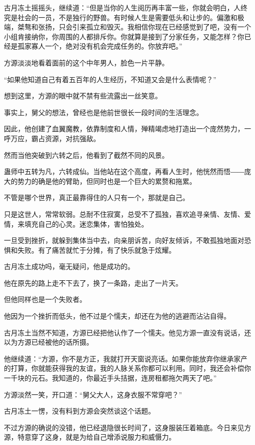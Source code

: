 \begin{this_body}
古月冻土摇摇头，继续道：“但是当你的人生阅历再丰富一些，你就会明白，人终究是社会的一员，不是独行的野兽。有时候人生是需要低头和让步的。偏激和极端，桀骜和张扬，只会引来孤立和毁灭。我相信你现在已经感觉到了吧，没有一个小组肯接纳你，你周围的人都排斥你。你就算是接到了分家任务，又能怎样？你已经是孤家寡人一个，绝对没有机会完成任务的。你放弃吧。”

方源淡淡地看着面前的这个中年男人，脸色一片平静。

“如果他知道自己有着五百年的人生经历，不知道又会是什么表情呢？”

想到这里，方源的眼中就不禁有些流露出一丝笑意。

事实上，舅父的想法，曾经也是他前世很长一段时间的生活理念。

因此，他创建了血翼魔教，依靠制度和人情，殚精竭虑地打造出一个庞然势力，一呼万应，霸占资源，对抗强敌。

然而当他突破到六转之后，他看到了截然不同的风景。

蛊师中五转为凡，六转成仙。当他站在这个高度，再看人生时，他恍然而悟――庞大的势力的确是他的臂助，但同时也是一个巨大的累赘和拖累。

不管是哪个世界，真正最靠得住的人只有一个，那就是自己。

只是这世人，常常软弱。总耐不住寂寞，总受不了孤独，喜欢追寻亲情、友情、爱情，来填充自己的心灵。迷恋集体，害怕独处。

一旦受到挫折，就躲到集体当中去，向亲朋诉苦，向好友倾诉，不敢孤独地面对恐惧和失败。有了痛苦就忙于分摊，有了快乐就急于炫耀。

古月冻土成功吗，毫无疑问，他是成功的。

他在原先的路上走不下去了，换了一条路，走出了一片天。

但他同样也是一个失败者。

他因为一个挫折而低头，他不过是个懦夫，却还在为他的逃避而沾沾自得。

古月冻土当然不知道，方源已经把他认作了一个懦夫。他见方源一直没有说话，还以为方源已经被他的话所摄。

他继续道：“方源，你不是方正，我就打开天窗说亮话。如果你能放弃你继承家产的打算，你就能获得我的友谊，我的人脉关系你都可以利用。同时，我还会补偿你一千块的元石。我知道的，你最近手头拮据，连房租都拖欠两天了吧。”

方源淡然一笑，开口道：“舅父大人，这身衣服不常穿吧？”

古月冻土一愣，没有料到方源会突然谈这个话题。

不过方源的确说的没错，他已经退隐很长时间了，这身服装压着箱底。今日来见方源，特意穿了这身，就是为给自己增添说服力和威慑力。


\end{this_body}
